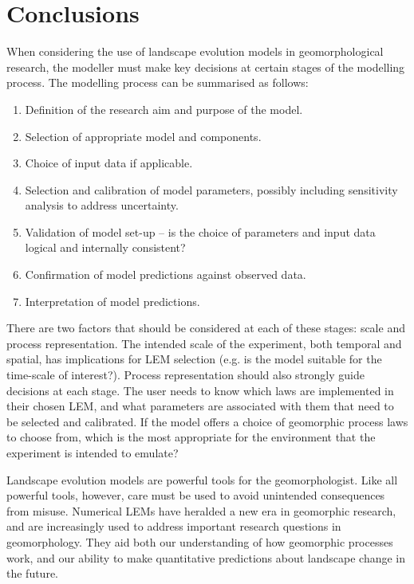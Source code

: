 \section{Conclusions}
When considering the use of landscape evolution models in geomorphological research, the modeller must make key decisions at certain stages of the modelling process. The modelling process can be summarised as follows: 

\begin{enumerate}
\item Definition of the research aim and purpose of the model.
\item Selection of appropriate model and components. 
\item Choice of input data if applicable. 
\item Selection and calibration of model parameters, possibly including sensitivity analysis to address uncertainty. 
\item Validation of model set-up – is the choice of parameters and input data logical and internally consistent?
\item Confirmation of model predictions against observed data. 
\item Interpretation of model predictions. 
\end{enumerate}

There are two factors that should be considered at each of these stages: scale and process representation. The intended scale of the experiment, both temporal and spatial, has implications for LEM selection (e.g. is the model suitable for the time-scale of interest?). Process representation should also strongly guide decisions at each stage. The user needs to know which laws are implemented in their chosen LEM, and what parameters are associated with them that need to be selected and calibrated. If the model offers a choice of geomorphic process laws to choose from, which is the most appropriate for the environment that the experiment is intended to emulate? 

Landscape evolution models are powerful tools for the geomorphologist. Like all powerful tools, however, care must be used to avoid unintended consequences from misuse. Numerical LEMs have heralded a new era in geomorphic research, and are increasingly used to address important research questions in geomorphology. They aid both our understanding of how geomorphic processes work, and our ability to make quantitative predictions about landscape change in the future.
